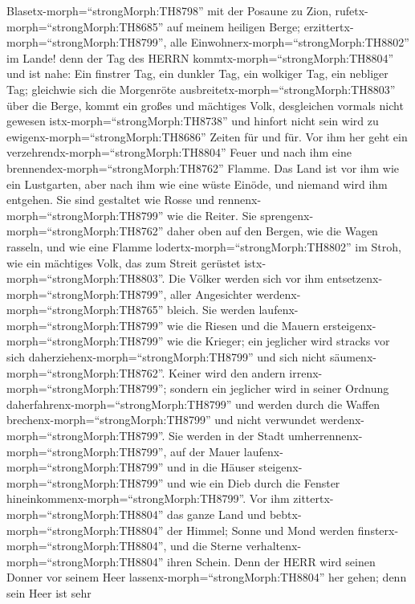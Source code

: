  Blasetx-morph=``strongMorph:TH8798'' mit der Posaune zu
Zion, rufetx-morph=``strongMorph:TH8685'' auf meinem heiligen Berge;
erzittertx-morph=``strongMorph:TH8799'', alle
Einwohnerx-morph=``strongMorph:TH8802'' im Lande! denn der Tag des HERRN
kommtx-morph=``strongMorph:TH8804'' und ist nahe:  Ein
finstrer Tag, ein dunkler Tag, ein wolkiger Tag, ein nebliger Tag;
gleichwie sich die Morgenröte ausbreitetx-morph=``strongMorph:TH8803''
über die Berge, kommt ein großes und mächtiges Volk, desgleichen vormals
nicht gewesen istx-morph=``strongMorph:TH8738'' und hinfort nicht sein
wird zu ewigenx-morph=``strongMorph:TH8686'' Zeiten für und für.
 Vor ihm her geht ein
verzehrendx-morph=``strongMorph:TH8804'' Feuer und nach ihm eine
brennendex-morph=``strongMorph:TH8762'' Flamme. Das Land ist vor ihm wie
ein Lustgarten, aber nach ihm wie eine wüste Einöde, und niemand wird
ihm entgehen.  Sie sind gestaltet wie Rosse und
rennenx-morph=``strongMorph:TH8799'' wie die Reiter.  Sie
sprengenx-morph=``strongMorph:TH8762'' daher oben auf den Bergen, wie
die Wagen rasseln, und wie eine Flamme
lodertx-morph=``strongMorph:TH8802'' im Stroh, wie ein mächtiges Volk,
das zum Streit gerüstet istx-morph=``strongMorph:TH8803''. 
Die Völker werden sich vor ihm entsetzenx-morph=``strongMorph:TH8799'',
aller Angesichter werdenx-morph=``strongMorph:TH8765'' bleich.
 Sie werden laufenx-morph=``strongMorph:TH8799'' wie die
Riesen und die Mauern ersteigenx-morph=``strongMorph:TH8799'' wie die
Krieger; ein jeglicher wird stracks vor sich
daherziehenx-morph=``strongMorph:TH8799'' und sich nicht
säumenx-morph=``strongMorph:TH8762''.  Keiner wird den
andern irrenx-morph=``strongMorph:TH8799''; sondern ein jeglicher wird
in seiner Ordnung daherfahrenx-morph=``strongMorph:TH8799'' und werden
durch die Waffen brechenx-morph=``strongMorph:TH8799'' und nicht
verwundet werdenx-morph=``strongMorph:TH8799''.  Sie werden
in der Stadt umherrennenx-morph=``strongMorph:TH8799'', auf der Mauer
laufenx-morph=``strongMorph:TH8799'' und in die Häuser
steigenx-morph=``strongMorph:TH8799'' und wie ein Dieb durch die Fenster
hineinkommenx-morph=``strongMorph:TH8799''.  Vor ihm
zittertx-morph=``strongMorph:TH8804'' das ganze Land und
bebtx-morph=``strongMorph:TH8804'' der Himmel; Sonne und Mond werden
finsterx-morph=``strongMorph:TH8804'', und die Sterne
verhaltenx-morph=``strongMorph:TH8804'' ihren Schein.  Denn
der HERR wird seinen Donner vor seinem Heer
lassenx-morph=``strongMorph:TH8804'' her gehen; denn sein Heer ist sehr
